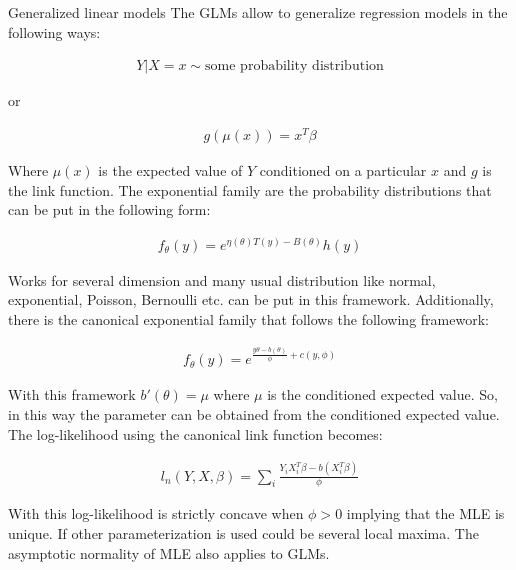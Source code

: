 \documentclass{beamer}
\begin{document}
\begin{columns}
\begin{column}{0.3\textwidth}
\begin{block}{Generalized linear models}
The GLMs allow to generalize regression models in the following ways:

\begin{align*}
    Y | X = x \sim \text{some probability distribution}
\end{align*}

or 

\begin{align*}
    g(\mu(x)) = x^T \beta
\end{align*}

Where $\mu(x)$ is the expected value of $Y$ conditioned on a particular $x$ and $g$ is the link function. The exponential family are the probability distributions that can be put in the following form:

\begin{align*}
    f_\theta(y) = e^{\eta(\theta)T(y) - B(\theta)} h(y)
\end{align*}

Works for several dimension and many usual distribution like normal, exponential, Poisson, Bernoulli etc. can be put in this framework. Additionally, there is the canonical exponential family that follows the following framework:

\begin{align*}
    f_\theta(y) = e^{\frac{y\theta - b(\theta)}{\phi} + c(y, \phi)}
\end{align*}

With this framework $b'(\theta) = \mu$ where $\mu$ is the conditioned expected value. So, in this way the parameter can be obtained from the conditioned expected value. The log-likelihood using the canonical link function becomes:

\begin{align*}
    l_n(Y, X, \beta) = \sum_i \frac{Y_i X_i^T \beta - b(X_i^T \beta)}{\phi}
\end{align*}

With this log-likelihood is strictly concave when $\phi > 0$ implying that the MLE is unique. If other parameterization is used could be several local maxima. The asymptotic normality of MLE also applies to GLMs.

\end{block} 

\end{column}
\end{columns}
\end{document}
